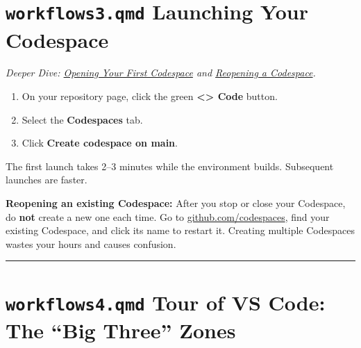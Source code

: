 \documentclass[
  letterpaper,
  DIV=11,
  numbers=noendperiod,
  oneside]{scrreprt}
\providecommand{\tightlist}{%
  \setlength{\itemsep}{0pt}\setlength{\parskip}{0pt}}
\begin{document}
\section*{\texorpdfstring{\texttt{workflows3.qmd} Launching Your
Codespace}{workflows3.qmd Launching Your Codespace}}\label{workflows3.qmd-launching-your-codespace}


\emph{Deeper Dive: \href{workflows03-open-codespace.qmd}{Opening Your
First Codespace} and \href{workflows04-reopen-codespace.qmd}{Reopening a
Codespace}.}

\begin{enumerate}
\def\labelenumi{\arabic{enumi}.}
\tightlist
\item
  On your repository page, click the green
  \textbf{\textless\textgreater{} Code} button.
\item
  Select the \textbf{Codespaces} tab.
\item
  Click \textbf{Create codespace on main}.
\end{enumerate}

The first launch takes 2--3 minutes while the environment builds.
Subsequent launches are faster.

\begin{tcolorbox}[enhanced jigsaw, title=\textcolor{quarto-callout-note-color}{\faInfo}\hspace{0.5em}{Note}, arc=.35mm, toptitle=1mm, colframe=quarto-callout-note-color-frame, toprule=.15mm, leftrule=.75mm, bottomtitle=1mm, opacityback=0, bottomrule=.15mm, coltitle=black, breakable, opacitybacktitle=0.6, titlerule=0mm, colback=white, left=2mm, colbacktitle=quarto-callout-note-color!10!white, rightrule=.15mm]

\textbf{Reopening an existing Codespace:} After you stop or close your
Codespace, do \textbf{not} create a new one each time. Go to
\href{https://github.com/codespaces}{github.com/codespaces}, find your
existing Codespace, and click its name to restart it. Creating multiple
Codespaces wastes your hours and causes confusion.

\end{tcolorbox}

\begin{center}\rule{0.5\linewidth}{0.5pt}\end{center}

\section*{\texorpdfstring{\texttt{workflows4.qmd} Tour of VS Code: The
``Big Three''
Zones}{workflows4.qmd Tour of VS Code: The ``Big Three'' Zones}}\label{workflows4.qmd-tour-of-vs-code-the-big-three-zones}
\end{document}
